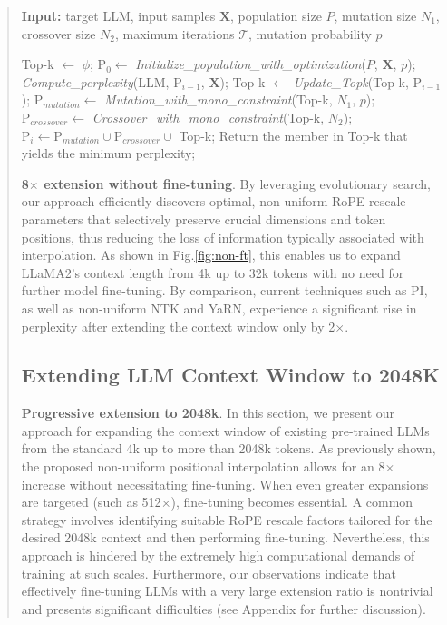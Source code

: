 \begin{abstract}
\begin{algorithm}[t]
	\small
	\caption{The search algorithm}
	\textbf{Input:} target LLM, input samples $\mathbf{X}$, population size $P$, mutation size $N_1$, crossover size $N_2$, maximum iterations $\mathcal{T}$, mutation probability $p$\\

	\begin{algorithmic}[1]
		\label{alg:search}
		\STATE Top-k $\gets$ $\phi$;
		\STATE $\text{P}_0 \gets$ \textit{Initialize\_population\_with\_optimization}($P$, $\mathbf{X}$, $p$);
		\STATE \textit{Compute\_perplexity}(LLM, $\text{P}_{i-1}$, $\mathbf{X}$);
		\STATE Top-k $\gets$ \textit{Update\_Topk}(Top-k, $\text{P}_{i-1}$);
		\STATE $\text{P}_{mutation} \gets$ \textit{Mutation\_with\_mono\_constraint}(Top-k, $N_1$, $p$);
		\STATE $\text{P}_{crossover} \gets$ \textit{Crossover\_with\_mono\_constraint}(Top-k, $N_2$);
		\STATE $\text{P}_i \gets \text{P}_{mutation} \cup \text{P}_{crossover} \cup$ Top-k;
		\ENDFOR
		\STATE Return the member in Top-k that yields the minimum perplexity;
	\end{algorithmic}
\end{algorithm}

\textbf{8$\times$ extension without fine-tuning}. By leveraging evolutionary search, our approach efficiently discovers optimal, non-uniform RoPE rescale parameters that selectively preserve crucial dimensions and token positions, thus reducing the loss of information typically associated with interpolation. As shown in Fig.\ref{fig:non-ft}, this enables us to expand LLaMA2's context length from 4k up to 32k tokens with no need for further model fine-tuning. By comparison, current techniques such as PI, as well as non-uniform NTK and YaRN, experience a significant rise in perplexity after extending the context window only by 2$\times$.

\subsection{Extending LLM Context Window to 2048K}
\label{sec:extendto2048k}

\textbf{Progressive extension to 2048k}. In this section, we present our approach for expanding the context window of existing pre-trained LLMs from the standard 4k up to more than 2048k tokens. As previously shown, the proposed non-uniform positional interpolation allows for an 8$\times$ increase without necessitating fine-tuning. When even greater expansions are targeted (such as 512$\times$), fine-tuning becomes essential. A common strategy involves identifying suitable RoPE rescale factors tailored for the desired 2048k context and then performing fine-tuning. Nevertheless, this approach is hindered by the extremely high computational demands of training at such scales. Furthermore, our observations indicate that effectively fine-tuning LLMs with a very large extension ratio is nontrivial and presents significant difficulties (see Appendix for further discussion).


\end{abstract}
